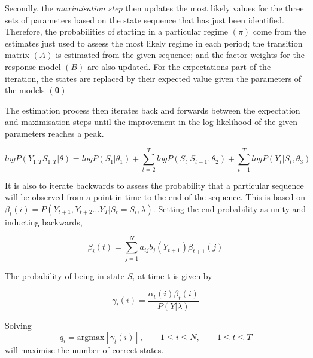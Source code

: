 \documentclass[12pt, a4paper, oneside]{article}\usepackage[]{graphicx}\usepackage[]{color}
\begin{document}
Secondly, the \emph{maximisation step} then updates the most likely values for the three sets of parameters based on the state sequence that has just been identified. Therefore, the probabilities of starting in a particular regime $(\pi)$ come from the estimates just used to assess the most likely regime in each period; the transition matrix $(A)$ is estimated from the given sequence; and the factor weights for the response model $(B)$ are also updated. For the expectations part of the iteration, the states are replaced by their expected value given the parameters of the models $(\mathbf{\theta})$ 

The estimation process then iterates back and forwards between the expectation and maximisation steps until the improvement in the log-likelihood of the given parameters reaches a peak. 

\begin{equation} 
log P(Y_{1:T}S_{1:T}| \theta) = log P(S_1|\theta_1) + \sum_{t=2}^T log P(S_t|S_{t-1}, \theta_2) + \sum_{t-1}^T log P(Y_t|S_t, \theta_3)
\end{equation}

It is also to iterate backwards to assess the probability that a particular sequence will be observed from a point in time to the end of the sequence.  This is based on $\beta_t(i) = P(Y_{t+1}, Y_{t+2}\dots Y_T| S_t = S_i, \lambda)$. Setting the end probability as unity and inducting backwards, 

\begin{equation} 
\beta_i(t) = \sum_{j = 1}^N a_{ij}b_j(Y_{t+1})\beta_{t+1}(j)
\end{equation}

The probability of being in state $S_i$ at time t is given by 

\begin{equation}
\gamma_t(i) = \frac{\alpha_t(i)\beta_t(i)}{P(Y|\lambda)}
\end{equation}

Solving
\begin{equation}
q_i = \text{argmax} [\gamma_t(i)], \qquad 1 \leq i \leq N, \qquad 1 \leq t \leq T  
\end{equation}
will maximise the number of correct states. 

\end{document}
